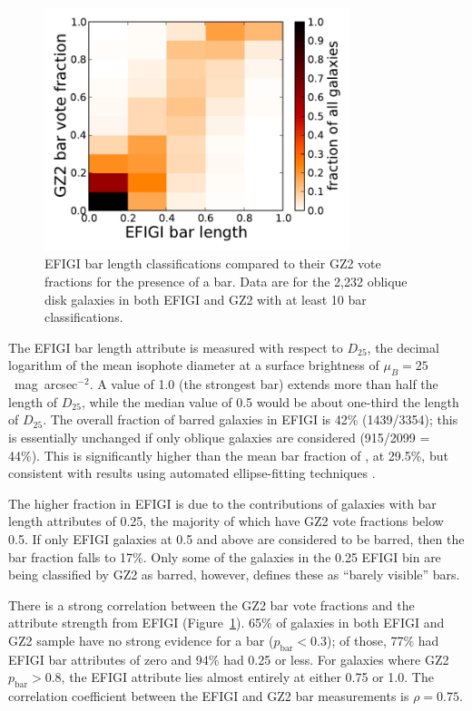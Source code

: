 \documentclass[useAMS,usenatbib]{mn2e}
\begin{document}
\begin{figure}
\includegraphics[angle=0,width=3.5in]{figures/efigi_bars.pdf}
\caption{EFIGI bar length classifications compared to their GZ2 vote fractions for the presence of a bar. Data are for the 2,232 oblique disk galaxies in both EFIGI and GZ2 with at least 10 bar classifications. 
\label{fig-efigi_bars}}
\end{figure}

The EFIGI bar length attribute is measured with respect to $D_{25}$, the decimal logarithm of the mean isophote diameter at a surface brightness of $\mu_B=25$~mag~arcsec$^{-2}$. A value of 1.0 (the strongest bar) extends more than half the length of $D_{25}$, while the median value of 0.5 would be about one-third the length of $D_{25}$. The overall fraction of barred galaxies in EFIGI is 42\% (1439/3354); this is essentially unchanged if only oblique galaxies are considered (915/2099 = 44\%). This is significantly higher than the mean bar fraction of \citet{mas11c}, at 29.5\%, but consistent with results using automated ellipse-fitting techniques \citep{bar08,agu09}. 

The higher fraction in EFIGI is due to the contributions of galaxies with bar length attributes of 0.25, the majority of which have GZ2 vote fractions below 0.5. If only EFIGI galaxies at 0.5 and above are considered to be barred, then the bar fraction falls to 17\%. Only some of the galaxies in the 0.25 EFIGI bin are being classified by GZ2 as barred, however, \citet{bai11} defines these as ``barely visible'' bars. %

There is a strong correlation between the GZ2 bar vote fractions and the attribute strength from EFIGI (Figure~\ref{fig-efigi_bars}). 65\% of galaxies in both EFIGI and GZ2 sample have no strong evidence for a bar ($p_\mathrm{bar}<0.3$); of those, 77\% had EFIGI bar attributes of zero and 94\% had 0.25 or less. For galaxies where GZ2 $p_\mathrm{bar}>0.8$, the EFIGI attribute lies almost entirely at either 0.75 or 1.0. The correlation coefficient between the EFIGI and GZ2 bar measurements is $\rho=0.75$. 
\end{document}
